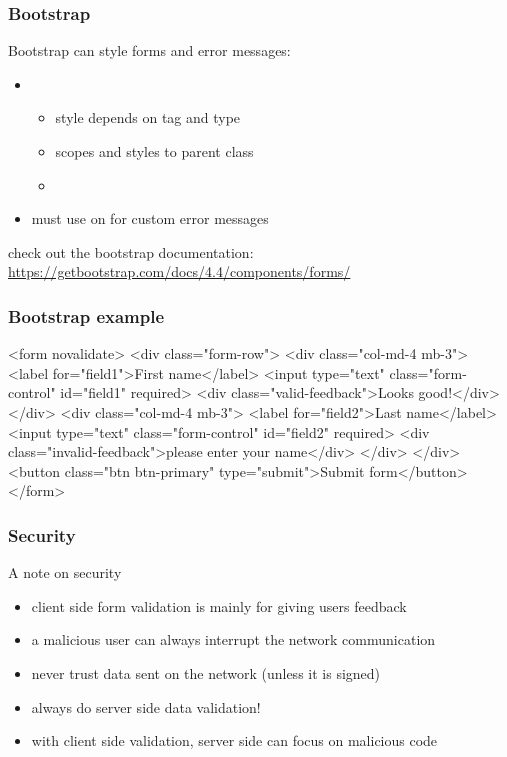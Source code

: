\begin{frame}[fragile] \frametitle{Bootstrap}
Bootstrap can style forms and error messages:
\begin{itemize}
  \item {}
          \\ 
  \begin{itemize}
    \item style depends on tag and type
    \item scopes  and  styles to parent  class 
    \item {}
  \end{itemize}
  \item must use  on  for custom error messages
\end{itemize}
\vspace{5mm}
check out the bootstrap documentation: \url{https://getbootstrap.com/docs/4.4/components/forms/}
\end{frame}

\begin{frame}[fragile] \frametitle{Bootstrap example}
\begin{CodeBox}{}
<form novalidate>
 <div class="form-row">
  <div class="col-md-4 mb-3">
   <label for="field1">First name</label>
   <input type="text" class="form-control" id="field1" required>
   <div class="valid-feedback">Looks good!</div>
  </div>
  <div class="col-md-4 mb-3">
   <label for="field2">Last name</label>
   <input type="text" class="form-control" id="field2" required>
   <div class="invalid-feedback">please enter your name</div>
  </div>
 </div>
 <button class="btn btn-primary" type="submit">Submit form</button>
</form>
\end{CodeBox}
\end{frame}
\begin{frame}[fragile] \frametitle{Security}
A note on security
\begin{itemize}
  \item client side form validation is mainly for giving users feedback
  \item a malicious user can always interrupt the network communication
  \item never trust data sent on the network (unless it is signed)
  \item always do server side data validation!
  \item with client side validation, server side can focus on malicious code
\end{itemize}
\end{frame}

